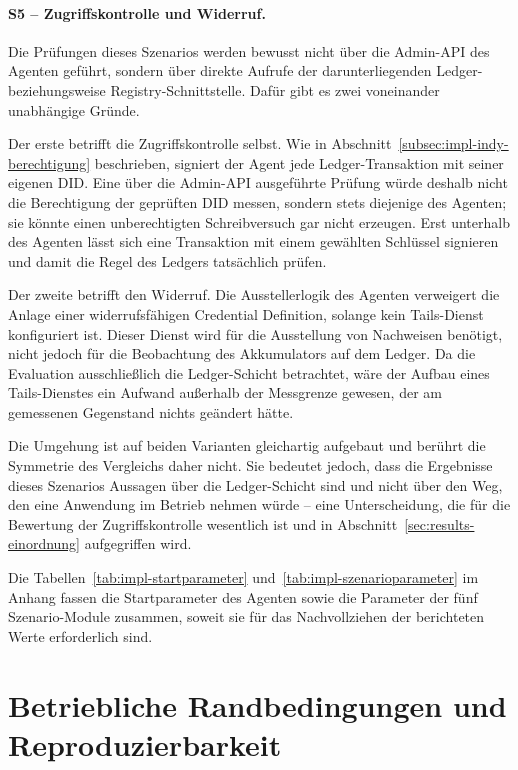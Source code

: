 \paragraph{S5 -- Zugriffskontrolle und Widerruf.}
\label{subsec:impl-szenario-s5}
Die Prüfungen dieses Szenarios werden bewusst nicht über die Admin-API des Agenten geführt, sondern über direkte Aufrufe der darunterliegenden Ledger- beziehungsweise Registry-Schnittstelle. Dafür gibt es zwei voneinander unabhängige Gründe.

Der erste betrifft die Zugriffskontrolle selbst. Wie in Abschnitt~\ref{subsec:impl-indy-berechtigung} beschrieben, signiert der Agent jede Ledger-Transaktion mit seiner eigenen DID. Eine über die Admin-API ausgeführte Prüfung würde deshalb nicht die Berechtigung der geprüften DID messen, sondern stets diejenige des Agenten; sie könnte einen unberechtigten Schreibversuch gar nicht erzeugen. Erst unterhalb des Agenten lässt sich eine Transaktion mit einem gewählten Schlüssel signieren und damit die Regel des Ledgers tatsächlich prüfen.

Der zweite betrifft den Widerruf. Die Ausstellerlogik des Agenten verweigert die Anlage einer widerrufsfähigen Credential Definition, solange kein Tails-Dienst konfiguriert ist. Dieser Dienst wird für die Ausstellung von Nachweisen benötigt, nicht jedoch für die Beobachtung des Akkumulators auf dem Ledger. Da die Evaluation ausschließlich die Ledger-Schicht betrachtet, wäre der Aufbau eines Tails-Dienstes ein Aufwand außerhalb der Messgrenze gewesen, der am gemessenen Gegenstand nichts geändert hätte.

Die Umgehung ist auf beiden Varianten gleichartig aufgebaut und berührt die Symmetrie des Vergleichs daher nicht. Sie bedeutet jedoch, dass die Ergebnisse dieses Szenarios Aussagen über die Ledger-Schicht sind und nicht über den Weg, den eine Anwendung im Betrieb nehmen würde -- eine Unterscheidung, die für die Bewertung der Zugriffskontrolle wesentlich ist und in Abschnitt~\ref{sec:results-einordnung} aufgegriffen wird.

Die Tabellen~\ref{tab:impl-startparameter} und~\ref{tab:impl-szenarioparameter} im Anhang fassen die Startparameter des Agenten sowie die Parameter der fünf Szenario-Module zusammen, soweit sie für das Nachvollziehen der berichteten Werte erforderlich sind.

\section{Betriebliche Randbedingungen und Reproduzierbarkeit}
\label{sec:impl-betrieb}

